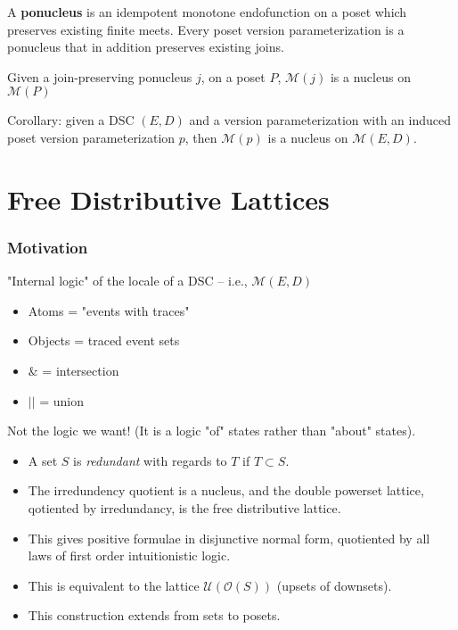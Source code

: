\documentclass{beamer}
\newcommand{\Mcc}{\mathcal{M}}
\newcommand{\Oc}{\mathcal{O}}
\newcommand{\Ucc}{\mathcal{U}}
\begin{document}
\begin{frame}

\begin{lemma}
A \textbf{ponucleus} is an idempotent monotone endofunction on a poset which preserves existing finite meets.
Every poset version parameterization is a ponucleus that in addition preserves existing joins.
\end{lemma}

\begin{theorem}
Given a join-preserving ponucleus \(j\), on a poset \(P\),  \(\Mcc(j)\) is a nucleus on \(\Mcc(P)\)
\end{theorem}

Corollary: given a DSC \((E,D)\) and a version parameterization with an induced poset version parameterization \(p\), then \(\Mcc(p)\) is a nucleus on \(\Mcc(E,D)\).
\end{frame}

\section{Free Distributive Lattices}
\begin{frame}
\frametitle{Motivation}
"Internal logic" of the locale of a DSC  -- i.e., \(\Mcc(E,D)\)
\begin{itemize}
\item Atoms = "events with traces"
\item Objects = traced event sets
\item \(\&\) = intersection
\item \(||\) = union
\end{itemize}

Not the logic we want! (It is a logic "of" states rather than "about" states).
\end{frame}

\begin{frame}
\begin{itemize}
\item A set \(S\) is \textit{redundant} with regards to \(T\) if \(T \subset S\). 
\item The irredundency quotient is a nucleus, and the double powerset lattice, qotiented by irredundancy, is the free distributive lattice. 
\item This gives positive formulae in disjunctive normal form, quotiented by all laws of first order intuitionistic logic.
\item This is equivalent to the lattice \(\Ucc(\Oc(S))\) (upsets of downsets).
\item This construction extends from sets to posets.
\end{itemize}
\end{frame}
\end{document}

